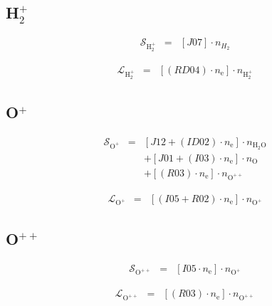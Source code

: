 \documentclass[12pt, letterpaper]{article}
\begin{document}
\subsection{H$_{2}^{+}$}
\begin{eqnarray}
\mathcal{S}_{\text{H}_{2}^{+}} & = & \left[ J07 \right] \cdot n_{H_{2}}
\end{eqnarray}

\begin{eqnarray}
\mathcal{L}_{\text{H}_{2}^{+}} & = & \left[ \left( RD04 \right) \cdot n_{\text{e}} \right] \cdot n_{\text{H}_{2}^{+}}
\end{eqnarray}

\subsection{O$^{+}$}
\begin{eqnarray}
\mathcal{S}_{\text{O}^{+}} & = & \left[ J12 + \left( ID02 \right) \cdot n_{\text{e}} \right] \cdot n_{\text{H}_{2}\text{O}} \nonumber \\
& & + \left[ J01 + \left( I03 \right) \cdot n_{\text{e}} \right] \cdot n_{\text{O}}  \nonumber \\
& & + \left[ \left( R03 \right) \cdot n_{\text{e}} \right] \cdot n_{\text{O}^{++}}
\end{eqnarray}

\begin{eqnarray}
\mathcal{L}_{\text{O}^{+}} & = & \left[ \left( I05 + R02 \right) \cdot n_{\text{e}} \right] \cdot n_{\text{O}^{+}}
\end{eqnarray}

\subsection{O$^{++}$}
\begin{eqnarray}
\mathcal{S}_{\text{O}^{++}} & = & \left[ I05 \cdot n_{\text{e}} \right] \cdot n_{\text{O}^{+}} 
\end{eqnarray}

\begin{eqnarray}
\mathcal{L}_{\text{O}^{++}} & = & \left[ \left( R03 \right) \cdot n_{\text{e}} \right] \cdot n_{\text{O}^{++}}
\end{eqnarray}
\end{document}
